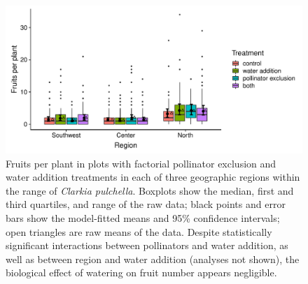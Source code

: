 \documentclass{article}
\begin{document}
\clearpage


\begin{figure}[p]
\centering
\includegraphics[width = \textwidth]{figs/fruits_water.pdf}
\caption{Fruits per plant in plots with factorial pollinator exclusion and water addition treatments in each of three geographic regions within the range of \textit{Clarkia pulchella}. Boxplots show the median, first and third quartiles, and range of the raw data; black points and error bars show the model-fitted means and 95\% confidence intervals; open triangles are raw means of the data. Despite statistically significant interactions between pollinators and water addition, as well as between region and water addition (analyses not shown), the biological effect of watering on fruit number appears negligible.}
\label{fruitswater}
\end{figure}
\end{document}
